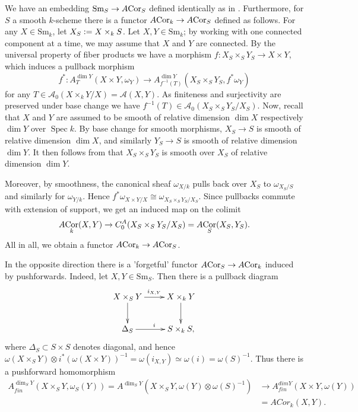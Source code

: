 \documentclass[a4paper, oneside, english,reqno]{amsart}
\theoremstyle{plain}
\theoremstyle{definition}
\theoremstyle{remark}
\newcommand{\defeq}{\vcentcolon=}
\newcommand{\ACor}{A\mkern-3mu\Cor}
\newcommand{\calA}{\mathcal{A}}
\newcommand{\Sm}{\mathrm{Sm}}
\DeclareMathOperator{\Spec}{Spec}
\DeclareMathOperator{\Cor}{Cor}
\begin{document}
We have an embedding $\Sm_S\to \ACor_S$ defined identically as in \cite{Calmes-Fasel}. Furthermore, for $S$ a smooth $k$-scheme there is a functor $\ACor_k\to \ACor_S$ defined as follows. For any $X\in\Sm_k$, let $X_S\defeq X\times_k S$. Let $X,Y\in\Sm_k$; by working with one connected component at a time, we may assume that $X$ and $Y$ are connected. By the universal property of fiber products we have a morphism $f\colon X_S\times_S Y_S\to X\times Y$, which induces a pullback morphism
\[
f^*\colon A_T^{\dim Y}(X\times Y,\omega_{Y})\to A_{f^{-1}(T)}^{\dim Y}(X_S\times_S Y_S,f^*\omega_{Y})
\]for any $T\in\calA_0(X\times_k Y/X)=\calA(X,Y)$. As finiteness and surjectivity are preserved under base change we have $f^{-1}(T)\in\calA_0(X_S\times_S Y_S/X_S)$. Now, recall that $X$ and $Y$ are assumed to be smooth of relative dimension $\dim X$ respectively $\dim Y$ over $\Spec k$. By base change for smooth morphisms, $X_S\to S$ is smooth of relative dimension $\dim X$, and similarly $Y_S\to S$ is smooth of relative dimension $\dim Y$. It then follows from \cite[III Proposition 10.1]{Hartshorne} that $X_S\times_S Y_S$ is smooth over $X_S$ of relative dimension $\dim Y$.

Moreover, by smoothness, the canonical sheaf $\omega_{X/k}$ pulls back over $X_S$ to $\omega_{X_S/S}$ and similarly for $\omega_{Y/k}$. Hence $f^*\omega_{X\times Y/X}\cong\omega_{X_S\times_S Y_S/X_S}$. Since pullbacks commute with extension of support, we get an induced map on the colimit
\[
\ACor_k(X,Y)\to C^A_0(X_S\times_S Y_S/X_S)=\ACor_S(X_S,Y_S).
\]
All in all, we obtain a functor $\ACor_k\to \ACor_S$.


In the opposite direction there is a 'forgetful' functor $\ACor_S\to \ACor_k$ induced by pushforwards.
Indeed, let $X,Y\in \Sm_S$. 
Then there is a pullback diagram
$$\xymatrix{
X\times_S Y \ar[r]^{i_{X,Y}}\ar[d] & X\times_k Y\ar[d]\\
\Delta_S \ar[r]^i & S\times_k S
,}$$
where $\Delta_S\subset S\times S$ denotes diagonal,
and hence $\omega(X\times_S Y)\otimes i^*(\omega(X\times Y))^{-1}= \omega(i_{X,Y}) \simeq \omega(i) = \omega(S)^{-1}$.
Thus there is a pushforward homomorphism 
\begin{align*}
A^{\dim_S Y}_{fin}(X\times_S Y,\omega_S (Y))=A^{\dim_S Y}(X\times_S Y,\omega(Y)\otimes \omega(S)^{-1})&\to 
A^{dim Y}_{fin}(X\times Y, \omega(Y) )\\
&=ACor_k(X,Y).
\end{align*}
 
\end{document}
